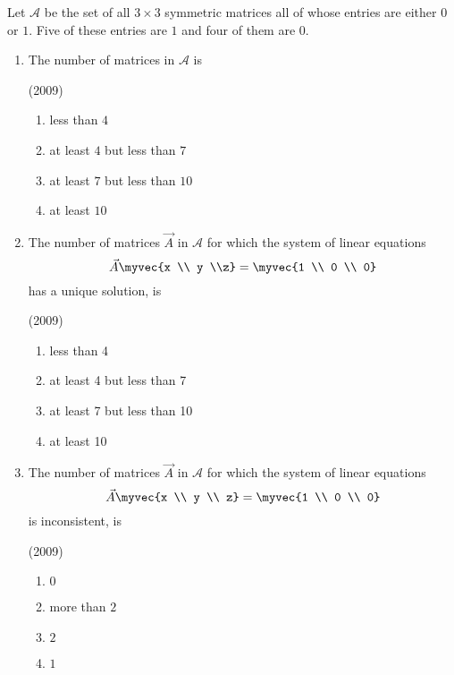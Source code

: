 


	\item Let $\mathcal{A}$ be the set of all $3\times3$ symmetric matrices all of whose entries are either $0$ or $1$. Five of these entries are $1$ and four of them are $0$.

	\begin{enumerate}
		\item The number of matrices in $\mathcal{A}$ is

			\hfill(2009)

			\begin{enumerate}
				\item less than $4$
				\item at least $4$ but less than $7$
				\item at least $7$ but less than $10$
				\item at least $10$
			\end{enumerate}
		
		\item The number of matrices $\vec{A}$ in $\mathcal{A}$ for which the system of linear equations
			$$\vec{A}\myvec{x \\ y \\z}=\myvec{1 \\ 0 \\ 0}$$
			has a unique solution, is

			\hfill(2009)

			\begin{enumerate}
				\item less than 4
				\item at least 4 but less than 7
				\item at least 7 but less than 10
				\item at least 10
			\end{enumerate}

		\item The number of matrices $\vec{A}$ in $\mathcal{A}$ for which the system of linear equations
			$$\vec{A}\myvec{x \\ y \\ z}=\myvec{1 \\ 0 \\ 0}$$
			is inconsistent, is

			\hfill(2009)

			\begin{enumerate}
				\item $0$
				\item more than $2$
				\item $2$
				\item $1$
			\end{enumerate}
	\end{enumerate}

